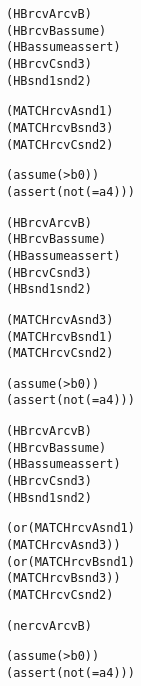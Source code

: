 \newsavebox{\boxSMTa}
\begin{lrbox}{\boxSMTa}
\begin{minipage}[c]{0.4\linewidth}
\begin{alltt}
(HB rcvA rcvB)
(HB rcvB assume)
(HB assume assert)
(HB rcvC snd3)
(HB snd1 snd2)

(MATCH rcvA snd1)
(MATCH rcvB snd3)
(MATCH rcvC snd2)

(assume (> b 0))
(assert (not (= a 4)))
\end{alltt}
\end{minipage}
\end{lrbox}

\newsavebox{\boxSMTb}
\begin{lrbox}{\boxSMTb}
\begin{minipage}[c]{0.4\linewidth}
\begin{alltt}
(HB rcvA rcvB)
(HB rcvB assume)
(HB assume assert)
(HB rcvC snd3)
(HB snd1 snd2)

(MATCH rcvA snd3)
(MATCH rcvB snd1)
(MATCH rcvC snd2)

(assume (> b 0))
(assert (not (= a 4)))
\end{alltt}
\end{minipage}
\end{lrbox}

\newsavebox{\boxSMTc}
\begin{lrbox}{\boxSMTc}
\begin{minipage}[c]{0.4\linewidth}
\begin{alltt}
(HB rcvA rcvB)
(HB rcvB assume)
(HB assume assert)
(HB rcvC snd3)
(HB snd1 snd2)

(or (MATCH rcvA snd1)
    (MATCH rcvA snd3))
(or (MATCH rcvB snd1)
    (MATCH rcvB snd3))
(MATCH rcvC snd2)

(ne rcvA rcvB)

(assume (> b 0))
(assert (not (= a 4)))


\end{alltt}
\end{minipage}
\end{lrbox}


